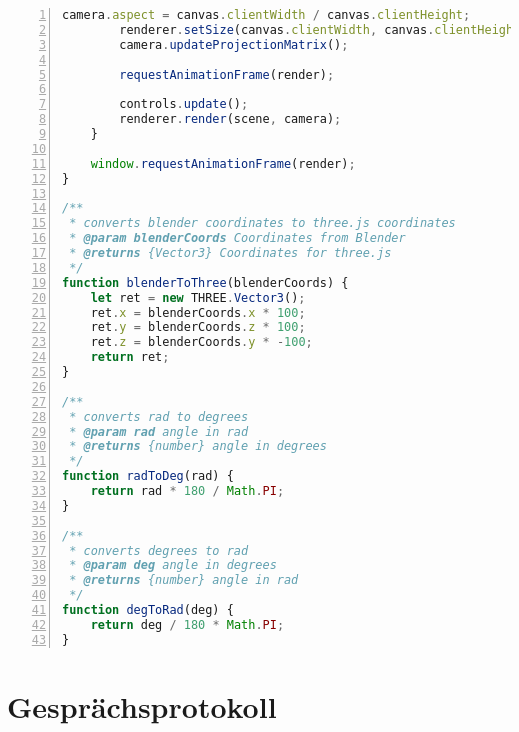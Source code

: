\documentclass[paper=a4,12pt]{scrreprt}
\begin{document}
\begin{lstlisting}[caption={Emulator-Sourcecode}, captionpos=b, label={listing:emu_source},language=javascript, numbers=left,
  stepnumber=1]
        camera.aspect = canvas.clientWidth / canvas.clientHeight;
        renderer.setSize(canvas.clientWidth, canvas.clientHeight, false);
        camera.updateProjectionMatrix();

        requestAnimationFrame(render);

        controls.update();
        renderer.render(scene, camera);
    }

    window.requestAnimationFrame(render);
}

/**
 * converts blender coordinates to three.js coordinates
 * @param blenderCoords Coordinates from Blender
 * @returns {Vector3} Coordinates for three.js
 */
function blenderToThree(blenderCoords) {
    let ret = new THREE.Vector3();
    ret.x = blenderCoords.x * 100;
    ret.y = blenderCoords.z * 100;
    ret.z = blenderCoords.y * -100;
    return ret;
}

/**
 * converts rad to degrees
 * @param rad angle in rad
 * @returns {number} angle in degrees
 */
function radToDeg(rad) {
    return rad * 180 / Math.PI;
}

/**
 * converts degrees to rad
 * @param deg angle in degrees
 * @returns {number} angle in rad
 */
function degToRad(deg) {
    return deg / 180 * Math.PI;
}
\end{lstlisting}

\chapter{Gesprächsprotokoll}
\end{document}
